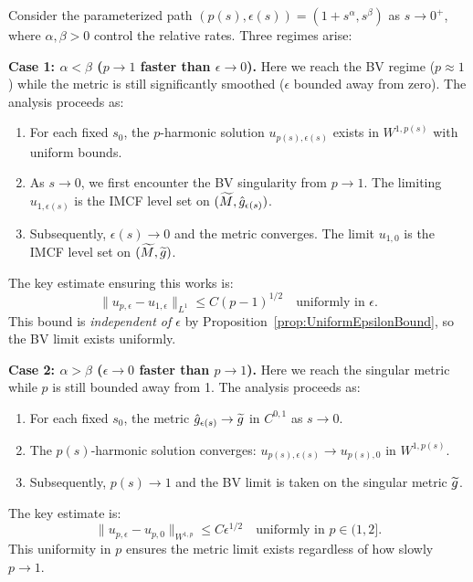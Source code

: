 \begin{remark}
Consider the parameterized path $(p(s), \epsilon(s)) = (1 + s^\alpha, s^\beta)$ as $s \to 0^+$, where $\alpha, \beta > 0$ control the relative rates. Three regimes arise:

\textbf{Case 1: $\alpha < \beta$ ($p \to 1$ faster than $\epsilon \to 0$).}
Here we reach the BV regime ($p \approx 1$) while the metric is still significantly smoothed ($\epsilon$ bounded away from zero). The analysis proceeds as:
\begin{enumerate}
    \item For each fixed $s_0$, the $p$-harmonic solution $u_{p(s), \epsilon(s)}$ exists in $W^{1,p(s)}$ with uniform bounds.
    \item As $s \to 0$, we first encounter the BV singularity from $p \to 1$. The limiting $u_{1, \epsilon(s)}$ is the IMCF level set on $(\widetilde{M}, \hat{g}_{\epsilon(s)})$.
    \item Subsequently, $\epsilon(s) \to 0$ and the metric converges. The limit $u_{1,0}$ is the IMCF level set on $(\widetilde{M}, \widetilde{g})$.
\end{enumerate}
The key estimate ensuring this works is:
\begin{equation}
    \|u_{p,\epsilon} - u_{1,\epsilon}\|_{L^1} \le C (p-1)^{1/2} \quad \text{uniformly in } \epsilon.
\end{equation}
This bound is \emph{independent of $\epsilon$} by Proposition~\ref{prop:UniformEpsilonBound}, so the BV limit exists uniformly.

\textbf{Case 2: $\alpha > \beta$ ($\epsilon \to 0$ faster than $p \to 1$).}
Here we reach the singular metric while $p$ is still bounded away from 1. The analysis proceeds as:
\begin{enumerate}
    \item For each fixed $s_0$, the metric $\hat{g}_{\epsilon(s)} \to \widetilde{g}$ in $C^{0,1}$ as $s \to 0$.
    \item The $p(s)$-harmonic solution converges: $u_{p(s), \epsilon(s)} \to u_{p(s), 0}$ in $W^{1,p(s)}$.
    \item Subsequently, $p(s) \to 1$ and the BV limit is taken on the singular metric $\widetilde{g}$.
\end{enumerate}
The key estimate is:
\begin{equation}
    \|u_{p,\epsilon} - u_{p,0}\|_{W^{1,p}} \le C \epsilon^{1/2} \quad \text{uniformly in } p \in (1, 2].
\end{equation}
This uniformity in $p$ ensures the metric limit exists regardless of how slowly $p \to 1$.


\end{remark}
